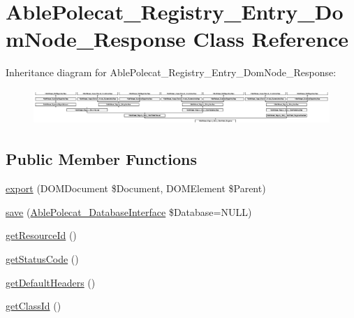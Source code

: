 \hypertarget{class_able_polecat___registry___entry___dom_node___response}{}\section{Able\+Polecat\+\_\+\+Registry\+\_\+\+Entry\+\_\+\+Dom\+Node\+\_\+\+Response Class Reference}
\label{class_able_polecat___registry___entry___dom_node___response}
Inheritance diagram for Able\+Polecat\+\_\+\+Registry\+\_\+\+Entry\+\_\+\+Dom\+Node\+\_\+\+Response\+:\begin{figure}[H]
\begin{center}
\leavevmode
\includegraphics[height=1.363636cm]{class_able_polecat___registry___entry___dom_node___response}
\end{center}
\end{figure}
\subsection*{Public Member Functions}
\begin{DoxyCompactItemize}
\item 
\hyperlink{class_able_polecat___registry___entry___dom_node___response_a0a05b2e4b3a44390eeb042064e427b1a}{export} (D\+O\+M\+Document \$Document, D\+O\+M\+Element \$Parent)
\item 
\hyperlink{class_able_polecat___registry___entry___dom_node___response_a999eef977eb899167ae02f83dd26a4ae}{save} (\hyperlink{interface_able_polecat___database_interface}{Able\+Polecat\+\_\+\+Database\+Interface} \$Database=N\+U\+L\+L)
\item 
\hyperlink{class_able_polecat___registry___entry___dom_node___response_a0ac412173b2b1d569ef90a1ac095ca5d}{get\+Resource\+Id} ()
\item 
\hyperlink{class_able_polecat___registry___entry___dom_node___response_a094778dd1c04fe44626000b47ea0c0bb}{get\+Status\+Code} ()
\item 
\hyperlink{class_able_polecat___registry___entry___dom_node___response_af81180728885fac65715855f27abd1ee}{get\+Default\+Headers} ()
\item 
\hyperlink{class_able_polecat___registry___entry___dom_node___response_acc9039051a8b6d4fe7c5ddfbaedbcbcb}{get\+Class\+Id} ()
\end{DoxyCompactItemize}
